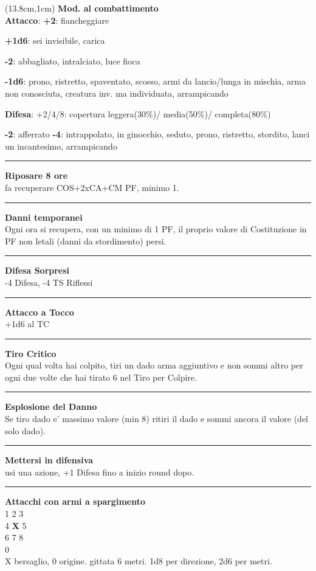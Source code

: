 \documentclass[a4paper,12 pt,openany]{book}
\newcommand{\riga}{\rule{\textwidth}{0.4pt}}
\begin{document}
\begin{textblock*}{6.2cm}(13.8cm,1cm) %
\textbf{Mod. al combattimento}\\
\textbf{Attacco}:
\textbf{+2}: fiancheggiare

\textbf{+1d6}: sei invisibile, carica

\textbf{-2}: abbagliato, intralciato, luce fioca

\textbf{-1d6}: prono, ristretto, spaventato, scosso, armi da lancio/lunga in mischia, arma non conosciuta, creatura inv. ma individuata, arrampicando

\textbf{Difesa}: +2/4/8: copertura leggera(30\%)/ media(50\%)/ completa(80\%)

\textbf{-2}: afferrato \textbf{-4}: intrappolato, in ginocchio, seduto, prono, ristretto, stordito, lanci un incantesimo, arrampicando
\riga

\textbf{Riposare 8 ore} \\fa recuperare COS+2xCA+CM PF, minimo 1.

\riga

\textbf{Danni temporanei}\\ Ogni ora si recupera, con un minimo di 1 PF, il proprio valore di Costituzione in PF non letali (danni da stordimento) persi.

\riga

\textbf{Difesa Sorpresi}\\ -4 Difesa, -4 TS Riflessi

\riga

\textbf{Attacco a Tocco}\\ +1d6 al TC

\riga

\textbf{Tiro Critico}\\
Ogni qual volta hai colpito, tiri un dado arma aggiuntivo e non sommi altro per ogni due volte che hai tirato 6 nel Tiro per Colpire.

\riga

\textbf{Esplosione del Danno}\\
Se tiro dado e' massimo valore (min 8) ritiri il dado e sommi ancora il valore (del solo dado).

\riga

\textbf{Mettersi in difensiva}\\
usi una azione, +1 Difesa fino a inizio round dopo.


\riga

\textbf{Attacchi con armi a spargimento}\\
		1 2 3\\
		4 \textbf{X} 5\\
		6 7 8\\
		0\\
		X bersaglio, 0 origine. gittata 6 metri. 1d8 per direzione, 2d6 per metri.


\end{textblock*}
\end{document}
